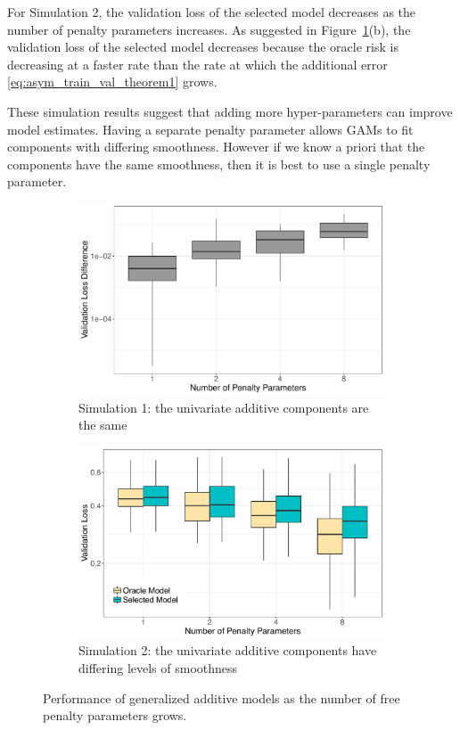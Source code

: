 \documentclass[12pt]{article} %
\theoremstyle{definition}
\begin{document}
For Simulation 2, the validation loss of the selected model decreases as the number of penalty parameters increases.
As suggested in Figure~\ref{fig:simulations}(b), the validation loss of the selected model decreases because the oracle risk is decreasing at a faster rate than the rate at which the additional error \eqref{eq:asym_train_val_theorem1} grows.

These simulation results suggest that adding more hyper-parameters can improve model estimates.
Having a separate penalty parameter allows GAMs to fit components with differing smoothness.
However if we know a priori that the components have the same smoothness, then it is best to use a single penalty parameter.

\begin{figure}
	\centering
	\begin{subfigure}{0.6\textwidth}
		\includegraphics[width=\textwidth]{../../../R/figures/validation_size_loss_diff_homogeneous.pdf}
		\caption{Simulation 1: the univariate additive components are the same}
	\end{subfigure}
	\begin{subfigure}{0.6\textwidth}
		\includegraphics[width=\textwidth]{../../../R/figures/validation_size_loss_heterogeneous_final.pdf}
		\caption{Simulation 2: the univariate additive components have differing levels of smoothness}
	\end{subfigure}
	\caption{
		Performance of generalized additive models as the number of free penalty parameters grows.
	}
	\label{fig:simulations}
\end{figure}
\end{document}
